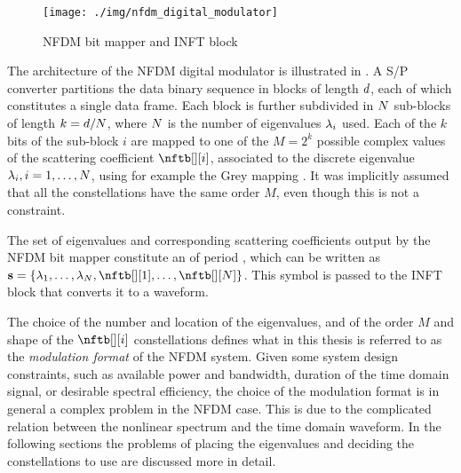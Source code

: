 \begin{figure}[t]
  \centering
  \texttt{[image: ./img/nfdm\_digital\_modulator]}
  \caption{\ac{NFDM} bit mapper and \ac{INFT} block}
  \label{fig:nfdm_digital_modulator}
\end{figure}

The architecture of the \ac{NFDM} digital modulator is illustrated in
. A \ac{S/P} converter partitions
the data binary sequence in blocks of length $\bitsperblock$, each of which constitutes a
single data frame. Each block is further subdivided in $\nEig$ sub-blocks of length
$k = \bitsperblock/\nEig$, where $\nEig$ is the number of eigenvalues $\eig[i]$ used. Each of the $k$ bits of the
sub-block $i$ are mapped to one of the $M = 2^k$ possible complex values of the
scattering coefficient $\nftb[][i]$, associated to the discrete eigenvalue $\eig[i],i=1,\dots,N$, using for example the Grey mapping \cite{proakisdigital}. It was
implicitly assumed that all the constellations have the same order $M$, even
though this is not a constraint.


The set of eigenvalues and corresponding scattering coefficients output by the \ac{NFDM} bit mapper constitute an \nfdmsymbol{} of period \Ts{}, which can be written as  $ \matr{s} = \nfdmsymtx{}$. This symbol is passed to the \ac{INFT} block that converts it to a waveform.


The choice of the number and location of the eigenvalues, and of the order $M$ and shape of the $\nftb[][i]$ constellations defines what in this thesis is referred to as the \textit{modulation format} of the \ac{NFDM} system. Given some system design constraints, such as available power and bandwidth, duration of the time domain signal, or desirable spectral efficiency, the choice of the modulation format is in general a complex problem in the \ac{NFDM} case. This is due to the complicated relation between the nonlinear spectrum and the time domain waveform. In the following sections the problems of placing the eigenvalues and deciding the constellations to use are discussed more in detail.


